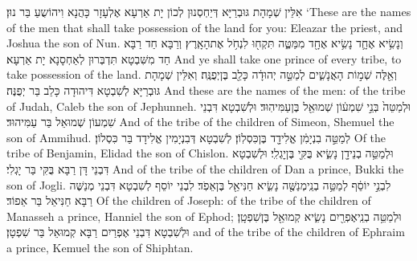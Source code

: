 {אִלֵּין שְׁמָהָת גּוּבְרַיָּא דְּיַחְסְנוּן לְכוֹן יָת אַרְעָא אֶלְעָזָר כָּהֲנָא וִיהוֹשֻעַ בַּר נוּן׃}
{‘These are the names of the men that shall take possession of the land for you: Eleazar the priest, and Joshua the son of Nun.}{}
{וְנָשִׂ֥יא אֶחָ֛ד נָשִׂ֥יא אֶחָ֖ד מִמַּטֶּ֑ה תִּקְח֖וּ לִנְחֹ֥ל אֶת\maqqaf הָאָֽרֶץ׃}
{וְרַבָּא חַד רַבָּא חַד מִשִּׁבְטָא תִּדְבְּרוּן לְאַחְסָנָא יָת אַרְעָא׃}
{And ye shall take one prince of every tribe, to take possession of the land.}{}
{וְאֵ֖לֶּה שְׁמ֣וֹת הָאֲנָשִׁ֑ים לְמַטֵּ֣ה יְהוּדָ֔ה כָּלֵ֖ב בֶּן\maqqaf יְפֻנֶּֽה׃}
{וְאִלֵּין שְׁמָהָת גּוּבְרַיָּא לְשִׁבְטָא דִּיהוּדָה כָּלֵב בַּר יְפֻנֶּה׃}
{And these are the names of the men: of the tribe of Judah, Caleb the son of Jephunneh.}{}
{וּלְמַטֵּה֙ בְּנֵ֣י שִׁמְע֔וֹן שְׁמוּאֵ֖ל בֶּן\maqqaf עַמִּיהֽוּד׃}
{וּלְשִׁבְטָא דִּבְנֵי שִׁמְעוֹן שְׁמוּאֵל בַּר עַמִּיהוּד׃}
{And of the tribe of the children of Simeon, Shemuel the son of Ammihud.}{}
{לְמַטֵּ֣ה בִנְיָמִ֔ן אֱלִידָ֖ד בֶּן\maqqaf כִּסְלֽוֹן׃}
{לְשִׁבְטָא דְּבִנְיָמִין אֱלִידָד בַּר כִּסְלוֹן׃}
{Of the tribe of Benjamin, Elidad the son of Chislon.}{}
{וּלְמַטֵּ֥ה בְנֵי\maqqaf דָ֖ן נָשִׂ֑יא בֻּקִּ֖י בֶּן\maqqaf יׇגְלִֽי׃}
{וּלְשִׁבְטָא דִּבְנֵי דָּן רַבָּא בֻּקִּי בַּר יָגְלִי׃}
{And of the tribe of the children of Dan a prince, Bukki the son of Jogli.}{}
{לִבְנֵ֣י יוֹסֵ֔ף לְמַטֵּ֥ה בְנֵֽי\maqqaf מְנַשֶּׁ֖ה נָשִׂ֑יא חַנִּיאֵ֖ל בֶּן\maqqaf אֵפֹֽד׃}
{לִבְנֵי יוֹסֵף לְשִׁבְטָא דִּבְנֵי מְנַשֶּׁה רַבָּא חַנִּיאֵל בַּר אֵפוֹד׃}
{Of the children of Joseph: of the tribe of the children of Manasseh a prince, Hanniel the son of Ephod;}{}
{וּלְמַטֵּ֥ה בְנֵֽי\maqqaf אֶפְרַ֖יִם נָשִׂ֑יא קְמוּאֵ֖ל בֶּן\maqqaf שִׁפְטָֽן׃}
{וּלְשִׁבְטָא דִּבְנֵי אֶפְרַיִם רַבָּא קְמוּאֵל בַּר שִׁפְטָן׃}
{and of the tribe of the children of Ephraim a prince, Kemuel the son of Shiphtan.}{}
